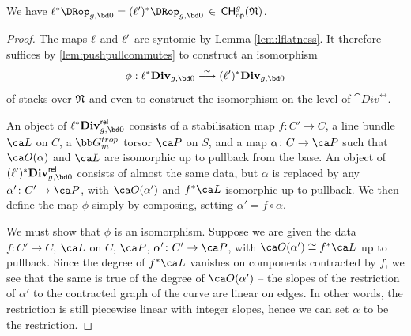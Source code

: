 \begin{lemma}
\notready\label{lem:N_invariance_DR}
We have $\targetmap^*\DRop_{g,\bd 0} = (\sourcemap)^*\DRop_{g, \bd 0} \, \in\, {\mathsf{CH}}^g_{\mathsf{op}}(\frak N)$.
\end{lemma}
\begin{proof}
The maps $\ell$ and $\ell'$ are syntomic
by Lemma \ref{lem:lflatness}.
It therefore suffices by \cref{lem:pushpullcommutes} to construct an isomorphism $$\phi: \targetmap^*\cat{Div}_{g,\bd 0} \isom (\sourcemap)^*\cat{Div}_{g,\bd 0}$$
of stacks over $\frak N$
and even to construct the isomorphism
on the level of $\cat{Div}^{\rel}$.


An object of $\targetmap^*\cat{Div}^{\rel}_{g,\bd 0}$ consists of a stabilisation map $f\colon C' \to C$, a line bundle $\ca L$ on $C$, a $\bb G_m^{trop}$ torsor $\ca P$ on $S$, and a map $\alpha \colon C \to \ca P$ such that $\ca O(\alpha )$ and $\ca L$ are isomorphic up to pullback from the base. An object of $(\sourcemap)^*\cat{Div}^{\rel}_{g,\bd 0}$ consists of almost the same data, but $\alpha$ is replaced by any $\alpha'\colon C' \to \ca P$, with $\ca O(\alpha')$ and $f^*\ca L$ isomorphic up to pullback. We then define the map $\phi$ simply by composing, setting $\alpha' = f \circ \alpha$.

We must show that $\phi$ is an isomorphism.
Suppose we are given the data $f\colon C' \to C$, $\ca L$ on $C$, $\ca P$, $\alpha' \colon C' \to \ca P$, with $\ca O(\alpha') \cong f^*\ca L$ up to pullback. Since the degree of $f^*\ca L$ vanishes on components contracted by $f$, we see that the same is true of the degree of $\ca O(\alpha')$ -- the slopes of the restriction of $\alpha'$ to the contracted graph of the curve are linear on edges. In other words, the restriction is still piecewise linear with integer slopes,  hence we can set $\alpha$ to be the restriction.
\end{proof}


